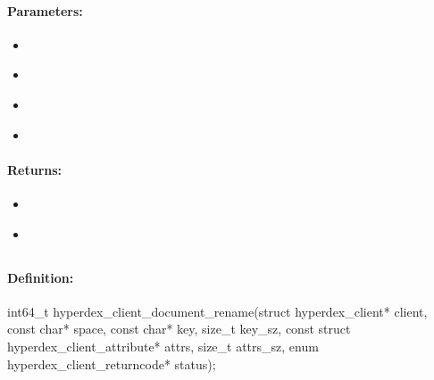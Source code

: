 \paragraph{Parameters:}
\begin{itemize}[noitemsep]
\item {}\\

\item {}\\

\item {}\\

\item {}\\

\end{itemize}

\paragraph{Returns:}
\begin{itemize}[noitemsep]
\item {}\\

\item {}\\

\end{itemize}

\pagebreak
\subsection{}
\label{api:c:document_rename}


\paragraph{Definition:}
\begin{ccode}
int64_t hyperdex_client_document_rename(struct hyperdex_client* client,
        const char* space,
        const char* key, size_t key_sz,
        const struct hyperdex_client_attribute* attrs, size_t attrs_sz,
        enum hyperdex_client_returncode* status);
\end{ccode}

